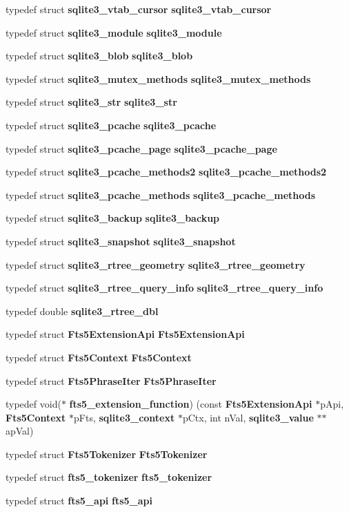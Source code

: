 \begin{DoxyCompactItemize}
typedef struct \textbf{ sqlite3\+\_\+vtab\+\_\+cursor} \textbf{ sqlite3\+\_\+vtab\+\_\+cursor}
\item 
typedef struct \textbf{ sqlite3\+\_\+module} \textbf{ sqlite3\+\_\+module}
\item 
typedef struct \textbf{ sqlite3\+\_\+blob} \textbf{ sqlite3\+\_\+blob}
\item 
typedef struct \textbf{ sqlite3\+\_\+mutex\+\_\+methods} \textbf{ sqlite3\+\_\+mutex\+\_\+methods}
\item 
typedef struct \textbf{ sqlite3\+\_\+str} \textbf{ sqlite3\+\_\+str}
\item 
typedef struct \textbf{ sqlite3\+\_\+pcache} \textbf{ sqlite3\+\_\+pcache}
\item 
typedef struct \textbf{ sqlite3\+\_\+pcache\+\_\+page} \textbf{ sqlite3\+\_\+pcache\+\_\+page}
\item 
typedef struct \textbf{ sqlite3\+\_\+pcache\+\_\+methods2} \textbf{ sqlite3\+\_\+pcache\+\_\+methods2}
\item 
typedef struct \textbf{ sqlite3\+\_\+pcache\+\_\+methods} \textbf{ sqlite3\+\_\+pcache\+\_\+methods}
\item 
typedef struct \textbf{ sqlite3\+\_\+backup} \textbf{ sqlite3\+\_\+backup}
\item 
typedef struct \textbf{ sqlite3\+\_\+snapshot} \textbf{ sqlite3\+\_\+snapshot}
\item 
typedef struct \textbf{ sqlite3\+\_\+rtree\+\_\+geometry} \textbf{ sqlite3\+\_\+rtree\+\_\+geometry}
\item 
typedef struct \textbf{ sqlite3\+\_\+rtree\+\_\+query\+\_\+info} \textbf{ sqlite3\+\_\+rtree\+\_\+query\+\_\+info}
\item 
typedef double \textbf{ sqlite3\+\_\+rtree\+\_\+dbl}
\item 
typedef struct \textbf{ Fts5\+Extension\+Api} \textbf{ Fts5\+Extension\+Api}
\item 
typedef struct \textbf{ Fts5\+Context} \textbf{ Fts5\+Context}
\item 
typedef struct \textbf{ Fts5\+Phrase\+Iter} \textbf{ Fts5\+Phrase\+Iter}
\item 
typedef void($\ast$ \textbf{ fts5\+\_\+extension\+\_\+function}) (const \textbf{ Fts5\+Extension\+Api} $\ast$p\+Api, \textbf{ Fts5\+Context} $\ast$p\+Fts, \textbf{ sqlite3\+\_\+context} $\ast$p\+Ctx, int n\+Val, \textbf{ sqlite3\+\_\+value} $\ast$$\ast$ap\+Val)
\item 
typedef struct \textbf{ Fts5\+Tokenizer} \textbf{ Fts5\+Tokenizer}
\item 
typedef struct \textbf{ fts5\+\_\+tokenizer} \textbf{ fts5\+\_\+tokenizer}
\item 
typedef struct \textbf{ fts5\+\_\+api} \textbf{ fts5\+\_\+api}
\end{DoxyCompactItemize}
